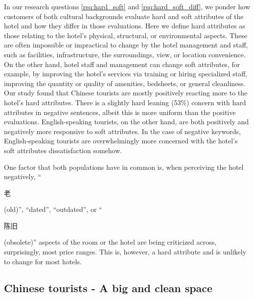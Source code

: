 \documentclass[smallextended,natbib]{svjour3}       %
\begin{document}
    In our research questions \ref{rsq:hard_soft} and \ref{rsq:hard_soft_diff}, we ponder how customers of both cultural backgrounds evaluate hard and soft attributes of the hotel and how they differ in those evaluations. Here we define hard attributes as those relating to the hotel's physical, structural, or environmental aspects. These are often impossible or impractical to change by the hotel management and staff, such as facilities, infrastructure, the surroundings, view, or location convenience. On the other hand, hotel staff and management can change soft attributes, for example, by improving the hotel's services via training or hiring specialized staff, improving the quantity or quality of amenities, bedsheets, or general cleanliness. Our study found that Chinese tourists are mostly positively reacting more to the hotel's hard attributes. There is a slightly hard leaning (53\%) concern with hard attributes in negative sentences, albeit this is more uniform than the positive evaluations. English-speaking tourists, on the other hand, are both positively and negatively more responsive to soft attributes. In the case of negative keywords, English-speaking tourists are overwhelmingly more concerned with the hotel's soft attributes dissatisfaction somehow.

    One factor that both populations have in common is, when perceiving the hotel negatively, ``\begin{CJK}{UTF8}{gbsn}老\end{CJK} (old)'', ``dated'', ``outdated'', or ``\begin{CJK}{UTF8}{gbsn}陈旧\end{CJK} (obsolete)'' aspects of the room or the hotel are being criticized across, surprisingly, most price ranges. This is, however, a hard attribute and is unlikely to change for most hotels.
    
  \subsection{Chinese tourists - A big and clean space}\label{disc:zh}
\end{document}
